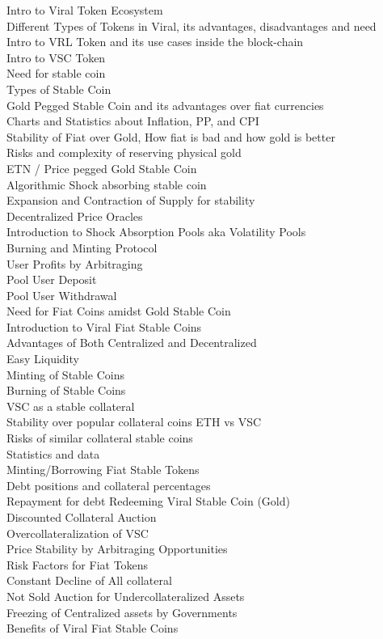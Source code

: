 \documentclass[conference]{IEEEtran}
\begin{document}
Intro to Viral Token Ecosystem\\
Different Types of Tokens in Viral, its advantages, disadvantages and need\\
Intro to VRL Token and its use cases inside the block-chain\\
Intro to VSC Token\\
Need for stable coin\\
Types of Stable Coin\\
Gold Pegged Stable Coin and its advantages over fiat currencies\\
Charts and Statistics about Inflation, PP, and CPI\\
Stability of Fiat over Gold, How fiat is bad and how gold is better\\
Risks and complexity of reserving physical gold\\
ETN / Price pegged Gold Stable Coin\\
Algorithmic Shock absorbing stable coin\\
Expansion and Contraction of Supply for stability\\
Decentralized Price Oracles\\
Introduction to Shock Absorption Pools aka Volatility Pools\\
Burning and Minting Protocol\\
User Profits by Arbitraging\\
Pool User Deposit\\
Pool User Withdrawal\\
Need for Fiat Coins amidst Gold Stable Coin\\
Introduction to Viral Fiat Stable Coins\\
Advantages of Both Centralized and Decentralized\\
Easy Liquidity\\
Minting of Stable Coins\\
Burning of Stable Coins\\
VSC as a stable collateral\\
Stability over popular collateral coins ETH vs VSC\\
Risks of similar collateral stable coins\\
Statistics and data\\
Minting/Borrowing Fiat Stable Tokens\\
Debt positions and collateral percentages\\
Repayment for debt Redeeming Viral Stable Coin (Gold)\\
Discounted Collateral Auction\\
Overcollateralization of VSC\\
Price Stability by Arbitraging Opportunities\\
Risk Factors for Fiat Tokens\\
Constant Decline of All collateral\\
Not Sold Auction for Undercollateralized Assets\\
Freezing of Centralized assets by Governments\\
Benefits of Viral Fiat Stable Coins\\
\end{document}
